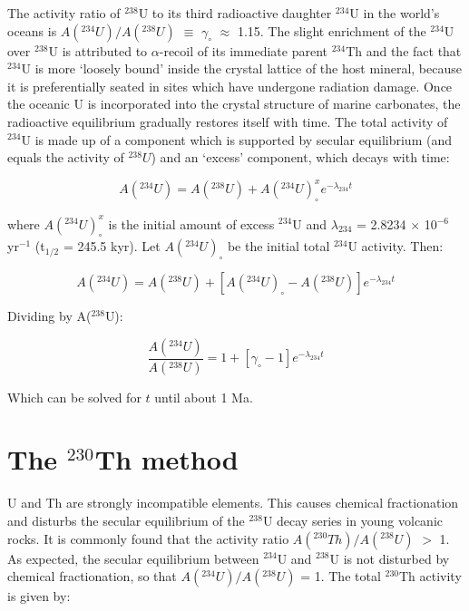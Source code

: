 \documentclass{book}
\begin{document}
The activity ratio of $^{238}$U to its third radioactive daughter
$^{234}$U in the world's oceans is $A(^{234}U)/A(^{238}U)$ $\equiv$
$\gamma_\circ$ $\approx$ 1.15. The slight enrichment of the $^{234}$U
over $^{238}$U is attributed to $\alpha$-recoil of its immediate
parent $^{234}$Th and the fact that $^{234}$U is more `loosely bound'
inside the crystal lattice of the host mineral, because it is
preferentially seated in sites which have undergone radiation
damage. Once the oceanic U is incorporated into the crystal structure
of marine carbonates, the radioactive equilibrium gradually restores
itself with time. The total activity of $^{234}$U is made up of a
component which is supported by secular equilibrium (and equals the
activity of $^{238}U$) and an `excess' component, which decays with
time:

\begin{equation}
A(^{234}U) = A(^{238}U) + A(^{234}U)^x_\circ e^{-\lambda_{234}t} 
\label{eq:A234}
\end{equation}

where $A(^{234}U)^x_\circ$ is the initial amount of excess $^{234}$U
and $\lambda_{234}$ = 2.8234 $\times$ 10$^{-6}$ yr$^{-1}$ (t$_{1/2}$ =
245.5 kyr). Let $A(^{234}U)_\circ$ be the initial total $^{234}$U
activity. Then:

\begin{equation}
A(^{234}U) = A(^{238}U) + \left[A(^{234}U)_\circ - A(^{238}U) \right] e^{-\lambda_{234}t} 
\label{eq:A234b}
\end{equation}

Dividing by A($^{238}$U):

\begin{equation}
\frac{A(^{234}U)}{A(^{238}U)} = 1 + [ \gamma_\circ - 1 ] e^{-\lambda_{234}t} 
\label{eq:A234A238}
\end{equation}

Which can be solved for $t$ until about 1 Ma.

\section{The $^{230}$Th method}
\label{sec:230}

U and Th are strongly incompatible elements. This causes chemical
fractionation and disturbs the secular equilibrium of the $^{238}$U
decay series in young volcanic rocks. It is commonly found that the
activity ratio $A(^{230}Th)/A(^{238}U)$ $>$ 1. As expected, the
secular equilibrium between $^{234}$U and $^{238}$U is not disturbed
by chemical fractionation, so that $A(^{234}U)/A(^{238}U)$ = 1. The
total $^{230}$Th activity is given by:
\end{document}
